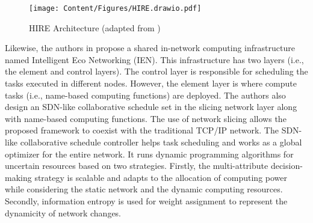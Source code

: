 \begin{figure}[!h]
\texttt{[image: Content/Figures/HIRE.drawio.pdf]}
\caption{HIRE Architecture (adapted from \cite{10.11453445814.3446760})}
\label{fig:hire}
\end{figure}


Likewise, the authors in \cite{9350853} propose a shared in-network computing infrastructure named Intelligent Eco Networking (IEN). This infrastructure has two layers (i.e., the element and control layers). The control layer is responsible for scheduling the tasks executed in different nodes. However, the element layer is where compute tasks (i.e., name-based computing functions) are deployed. The authors also design an SDN-like collaborative schedule set in the slicing network layer along with name-based computing functions. The use of network slicing allows the proposed framework to coexist with the traditional TCP/IP network. The SDN-like collaborative schedule controller helps task scheduling and works as a global optimizer for the entire network. It runs dynamic programming algorithms for uncertain resources based on two strategies. Firstly, the multi-attribute decision-making strategy is scalable and adapts to the allocation of computing power while considering the static network and the dynamic computing resources. Secondly, information entropy is used for weight assignment to represent the dynamicity of network changes.

